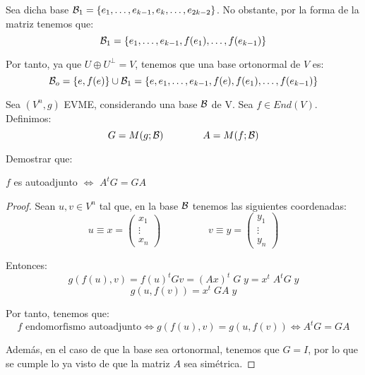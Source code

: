 \begin{ejercicio}
\begin{itemize}
        Sea dicha base $\mathcal{B}_1 = \{e_1, \dots, e_{k-1}, e_k, \dots, e_{2k-2}\}$. No obstante, por la forma de la matriz tenemos que:
        \begin{equation*}
            \mathcal{B}_1 = \{e_1, \dots, e_{k-1}, f(e_1), \dots, f(e_{k-1})\} 
        \end{equation*}

        Por tanto, ya que $U\oplus U^\perp = V$, tenemos que una base ortonormal de $V$ es:
        \begin{equation*}
            \mathcal{B}_o = \{e, f(e)\} \cup \mathcal{B}_1 = \left\{e, e_1, \dots, e_{k-1}, f(e), f(e_1), \dots, f(e_{k-1})\right\}
        \end{equation*}
    \end{itemize}
\end{ejercicio}


\begin{ejercicio}\label{Ej17}
    Sea $(V^n, g)$ EVME, considerando una base $\mathcal{B}$ de V. Sea $f\in End(V)$. Definimos:
    \begin{equation*}
        G=M(g;\mathcal{B}) \qquad \qquad A=M(f;\mathcal{B})
    \end{equation*}

    Demostrar que:
    \begin{center}
        $f$ es autoadjunto $\Longleftrightarrow$ $A^tG=GA$
    \end{center}

    \begin{proof}
        Sean $u,v\in V^n$ tal que, en la base $\mathcal{B}$ tenemos las siguientes coordenadas:
        $$u\equiv x = \left(\begin{array}{c}
            x_1 \\ \vdots \\ x_n
        \end{array}\right) \hspace{2cm} v\equiv y = \left(\begin{array}{c}
            y_1 \\ \vdots \\ y_n
        \end{array}\right)$$

        Entonces:
        \begin{equation*}
            g(f(u), v) = f(u)^t G v = (Ax)^t\;G\;y = x^t\;A^tG\;y
        \end{equation*}
        \begin{equation*}
            g(u,f(v)) = x^t\;GA\;y
        \end{equation*}

        Por tanto, tenemos que:
        \begin{equation*}
            f \text{ endomorfismo autoadjunto} \Longleftrightarrow g(f(u), v) = g(u,f(v)) \Longleftrightarrow A^tG = GA
        \end{equation*}

        Además, en el caso de que la base sea ortonormal, tenemos que $G=I$, por lo que se cumple lo ya visto de que la matriz $A$ sea simétrica.
    \end{proof}
\end{ejercicio}



